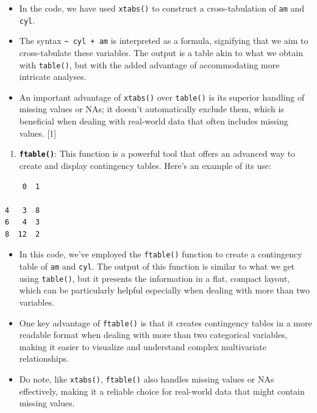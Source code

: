\documentclass[
  letterpaper,
  DIV=11,
  numbers=noendperiod]{scrreport}
\newenvironment{Shaded}{\begin{snugshade}}{\end{snugshade}}
\newcommand{\FunctionTok}[1]{\textcolor[rgb]{0.28,0.35,0.67}{#1}}
\newcommand{\NormalTok}[1]{\textcolor[rgb]{0.00,0.23,0.31}{#1}}
\newcommand{\SpecialCharTok}[1]{\textcolor[rgb]{0.37,0.37,0.37}{#1}}
\providecommand{\tightlist}{%
  \setlength{\itemsep}{0pt}\setlength{\parskip}{0pt}}\usepackage{longtable,booktabs,array}
\begin{document}
\begin{itemize}
\item
  In the code, we have used \texttt{xtabs()} to construct a
  cross-tabulation of \texttt{am} and \texttt{cyl}.
\item
  The syntax \texttt{\textasciitilde{}\ cyl\ +\ am} is interpreted as a
  formula, signifying that we aim to cross-tabulate these variables. The
  output is a table akin to what we obtain with \texttt{table()}, but
  with the added advantage of accommodating more intricate analyses.
\item
  An important advantage of \texttt{xtabs()} over \texttt{table()} is
  its superior handling of missing values or NAs; it doesn't
  automatically exclude them, which is beneficial when dealing with
  real-world data that often includes missing values. {[}1{]}
\end{itemize}

\begin{enumerate}
\def\labelenumi{\arabic{enumi}.}
\setcounter{enumi}{3}
\tightlist
\item
  \textbf{\texttt{ftable()}}: This function is a powerful tool that
  offers an advanced way to create and display contingency tables.
  Here's an example of its use:
\end{enumerate}

\begin{Shaded}
\end{Shaded}

\begin{verbatim}
    0  1
        
4   3  8
6   4  3
8  12  2
\end{verbatim}

\begin{itemize}
\item
  In this code, we've employed the \texttt{ftable()} function to create
  a contingency table of \texttt{am} and \texttt{cyl}. The output of
  this function is similar to what we get using \texttt{table()}, but it
  presents the information in a flat, compact layout, which can be
  particularly helpful especially when dealing with more than two
  variables.
\item
  One key advantage of \texttt{ftable()} is that it creates contingency
  tables in a more readable format when dealing with more than two
  categorical variables, making it easier to visualize and understand
  complex multivariate relationships.
\item
  Do note, like \texttt{xtabs()}, \texttt{ftable()} also handles missing
  values or NAs effectively, making it a reliable choice for real-world
  data that might contain missing values.
\end{itemize}
\end{document}
